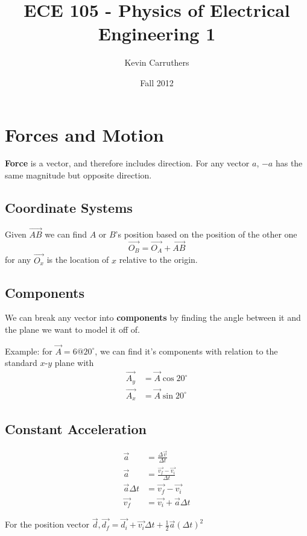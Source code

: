 \documentclass[12pt]{article}
\begin{document}
\title{ECE 105 - Physics of Electrical Engineering 1}
\author{Kevin Carruthers}
\date{\vspace{-2ex}Fall 2012}
\maketitle\HRule

\section*{Forces and Motion}
{\bf Force} is a vector, and therefore includes direction. For any vector $a$, $-a$ has the same magnitude but opposite direction.

\subsection*{Coordinate Systems}
Given $\vec{AB}$ we can find $A$ or $B$'s position based on the position of the other one \[ \vec{O_B} = \vec{O_A} + \vec{AB} \] for any $\vec{O_x}$ is the location of $x$ relative to the origin.

\subsection*{Components}
We can break any vector into {\bf components} by finding the angle between it and the plane we want to model it off of.

Example: for $\vec{A} = 6 @ 20^\circ$, we can find it's components with relation to the standard $x$-$y$ plane with
\begin{align*}
\vec{A_y} &= \vec{A}\cos 20^\circ\\
\vec{A_x} &= \vec{A}\sin 20^\circ
\end{align*}

\subsection*{Constant Acceleration}
\begin{align*}
\vec{a} &= \frac{\Delta\vec{v}}{\Delta t}\\
\vec{a} &= \frac{\vec{v_f}-\vec{v_i}}{\Delta t}\\
\vec{a}\Delta t &= \vec{v_f}-\vec{v_i}\\
\vec{v_f} &= \vec{v_i} + \vec{a}\Delta t
\end{align*}

For the position vector $\vec{d}, \vec{d_f} = \vec{d_i} + \vec{v_i}\Delta t + \frac{1}{2}\vec{a}(\Delta t)^2$
\end{document}
